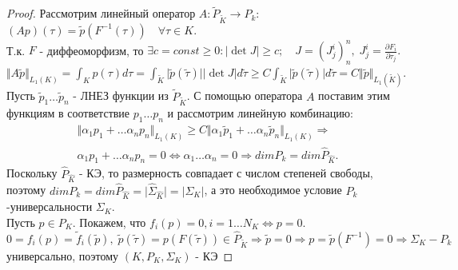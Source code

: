 \documentclass[__main__.tex]{subfiles}
\begin{document}
\begin{proof}
	Рассмотрим линейный оператор $A:\tilde{P}_{\tilde{K}}\rightarrow P_k$: 
	$\left(Ap\right)(\tau)=\tilde{p}\left(F^{-1}(\tau)\right)\quad\forall\tau\in K.$\\
	Т.к. $F$ - диффеоморфизм, то $\exists c=const\ge 0:\vert\det J\vert\ge c;\quad J=(J^i_j)^n_n,\;J^i_j=\frac{\partial F_i}{\partial\tau_j}.$\\
	$\Vert A\tilde{p}\Vert_{L_1(K)}=\int_K p(\tau)d\tau=\int_{\tilde{K}}\vert\tilde{p}(\tilde{\tau})\vert\vert\det J\vert d\tilde{\tau}\ge C\int_{\tilde{K}}\vert\tilde{p}(\tilde{\tau})\vert d\tilde{\tau}=C\Vert\tilde{p}\Vert_{L_1(\tilde{K})}$.\\
	Пусть $\tilde{p}_1\dots\tilde{p}_n$ - ЛНЕЗ функции из $\tilde{P}_{\tilde{K}}$. С помощью оператора $A$ поставим этим функциям в соответствие $p_1\dots p_n$ и рассмотрим линейную комбинацию:\\
	\begin{gather*}
		\Vert\alpha_1 p_1+\dots\alpha_n p_n\Vert_{L_1(K)}\ge C\Vert\alpha_1 \tilde{p}_1+\dots\alpha_n\tilde{p}_n\Vert_{L_1(K)}\Rightarrow\\
		\alpha_1 p_1+\dots\alpha_n p_n=0\Leftrightarrow \alpha_1\dots\alpha_n=0\Rightarrow dimP_k=dim\hat{P}_{\hat{K}}.
	\end{gather*}
	Поскольку $\hat{P}_{\hat{K}}$ - КЭ, то размерность совпадает с числом степеней свободы, поэтому $dimP_k=dim\hat{P}_{\hat{K}}=\vert\hat{\Sigma}_{\hat{K}}\vert=\vert\Sigma_K\vert$, а это необходимое условие $P_k$-универсальности $\Sigma_K.$\\
	Пусть $p\in P_K.$ Покажем, что $f_i(p)=0,i=1\dots N_K\Leftrightarrow p=0.$\\
	$0=f_i(p)=\tilde{f}_i(\tilde{p}),\;\tilde{p}(\tilde{\tau})=p(F(\tilde{\tau}))\in\hat{P}_{\tilde{K}}\Rightarrow\tilde{p}=0\Rightarrow p=\tilde{p}(F^{-1})=0\Rightarrow \Sigma_K-P_k$ универсально, поэтому $(K,P_K,\Sigma_K)$ - КЭ
\end{proof}
\end{document}
